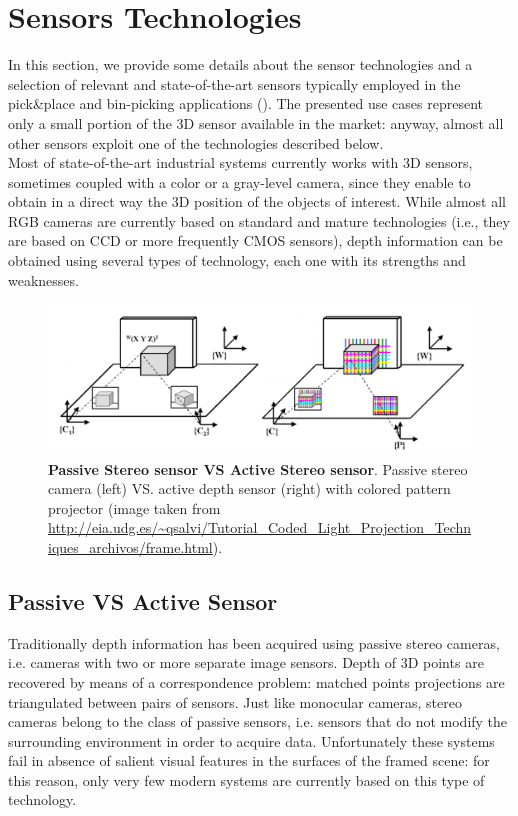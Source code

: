 \section{Sensors Technologies}\label{sec:sensor_techs}
In this section, we provide some details about the sensor technologies and a selection of relevant and state-of-the-art sensors typically employed in the pick\&place and bin-picking applications (). The presented use cases represent only a small portion of the 3D sensor available in the market: anyway, almost all other sensors exploit one of the technologies described below.\\
Most of state-of-the-art industrial systems currently works with 3D sensors, sometimes coupled with a color or a gray-level camera, since they enable to obtain in a direct way the 3D position of the objects of interest. While almost all RGB cameras are currently based on standard and mature technologies (i.e., they are based on CCD or more frequently CMOS sensors), depth information can be obtained using several types of technology, each one with its strengths and weaknesses.

\begin{figure}
    \centering
    \includegraphics[width=\textwidth]{figures/1_perception_and_sensing_in_robotics/active_vs_passive}
    \caption{\textbf{Passive Stereo sensor VS Active Stereo sensor}. Passive stereo camera (left) VS. active depth sensor (right) with colored pattern projector (image taken from \url{http://eia.udg.es/~qsalvi/Tutorial_Coded_Light_Projection_Techniques_archivos/frame.html}​).} 
    \label{fig:active_vs_passive}
\end{figure}

\subsection{Passive VS Active Sensor}\label{subsec:passiveVsActive}
Traditionally depth information has been acquired using passive stereo cameras, i.e. cameras with two or more separate image sensors. Depth of 3D points are recovered by means of a correspondence problem: matched points projections are triangulated between pairs of sensors. 
Just like monocular cameras, stereo cameras belong to the class of passive sensors, i.e. sensors that do not modify the surrounding environment in order to acquire data.
Unfortunately these systems fail in absence of salient visual features in the surfaces of the framed scene: for this reason, only very few modern systems are currently based on this type of technology.

